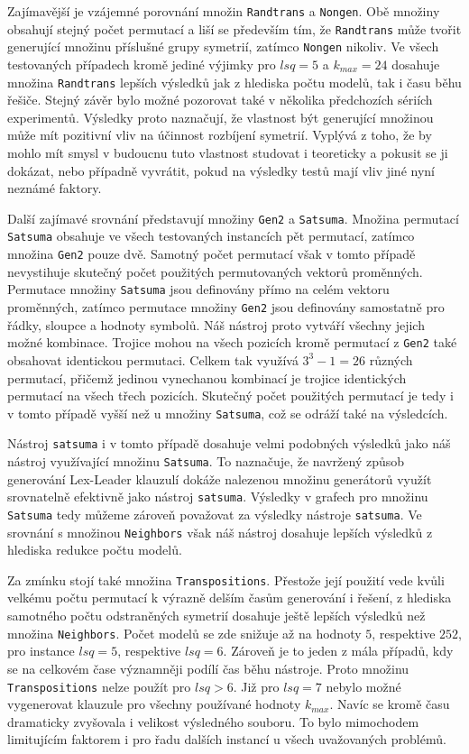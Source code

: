Zajímavější je vzájemné porovnání množin \texttt{Randtrans} a \texttt{Nongen}. Obě množiny obsahují stejný počet permutací a liší se především tím, že \texttt{Randtrans} může tvořit generující množinu příslušné grupy symetrií, zatímco \texttt{Nongen} nikoliv. Ve všech testovaných případech kromě jediné výjimky pro $lsq = 5$ a $k_{max}=24$ dosahuje množina \texttt{Randtrans} lepších výsledků jak z hlediska počtu modelů, tak i času běhu řešiče. Stejný závěr bylo možné pozorovat také v několika předchozích sériích experimentů. Výsledky proto naznačují, že vlastnost být generující množinou může mít pozitivní vliv na účinnost rozbíjení symetrií. Vyplývá z toho, že by mohlo mít smysl v budoucnu tuto vlastnost studovat i teoreticky a pokusit se ji dokázat, nebo případně vyvrátit, pokud na výsledky testů mají vliv jiné nyní neznámé faktory.

Další zajímavé srovnání představují množiny \texttt{Gen2} a \texttt{Satsuma}. Množina permutací \texttt{Satsuma} obsahuje ve všech testovaných instancích pět permutací, zatímco množina \texttt{Gen2} pouze dvě. Samotný počet permutací však v tomto případě nevystihuje skutečný počet použitých permutovaných vektorů proměnných. Permutace množiny \texttt{Satsuma} jsou definovány přímo na celém vektoru proměnných, zatímco permutace množiny \texttt{Gen2} jsou definovány samostatně pro řádky, sloupce a hodnoty symbolů. Náš nástroj proto vytváří všechny jejich možné kombinace. Trojice mohou na všech pozicích kromě permutací z \texttt{Gen2} také obsahovat identickou permutaci. Celkem tak využívá $3^3-1=26$ různých permutací, přičemž jedinou vynechanou kombinací je trojice identických permutací na všech třech pozicích. Skutečný počet použitých permutací je tedy i v tomto případě vyšší než u množiny \texttt{Satsuma}, což se odráží také na výsledcích.

Nástroj \texttt{satsuma} i v tomto případě dosahuje velmi podobných výsledků jako náš nástroj využívající množinu \texttt{Satsuma}. To naznačuje, že navržený způsob generování Lex-Leader klauzulí dokáže nalezenou množinu generátorů využít srovnatelně efektivně jako nástroj \texttt{satsuma}. Výsledky v grafech pro množinu \texttt{Satsuma} tedy můžeme zároveň považovat za výsledky nástroje \texttt{satsuma}. Ve srovnání s množinou \texttt{Neighbors} však náš nástroj dosahuje lepších výsledků z hlediska redukce počtu modelů. 

Za zmínku stojí také množina \texttt{Transpositions}. Přestože její použití vede kvůli velkému počtu permutací k výrazně delším časům generování i řešení, z hlediska samotného počtu odstraněných symetrií dosahuje ještě lepších výsledků než množina \texttt{Neighbors}. Počet modelů se zde snižuje až na hodnoty $5$, respektive $252$, pro instance $lsq=5$, respektive $lsq=6$. Zároveň je to jeden z mála případů, kdy se na celkovém čase významněji podílí čas běhu nástroje. Proto množinu \texttt{Transpositions} nelze použít pro $lsq>6$. Již pro $lsq=7$ nebylo možné vygenerovat klauzule pro všechny používané hodnoty $k_{max}$. Navíc se kromě času dramaticky zvyšovala i velikost výsledného souboru. To bylo mimochodem limitujícím faktorem i pro řadu dalších instancí u všech uvažovaných problémů.

